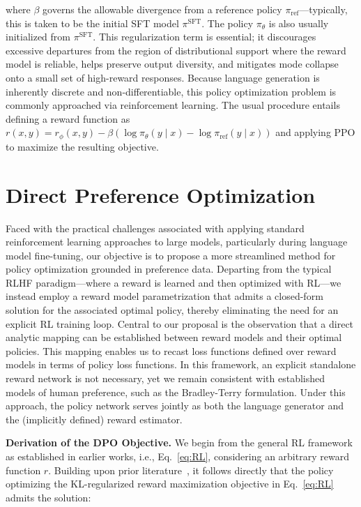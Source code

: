 where $\beta$ governs the allowable divergence from a reference policy $\pi_\text{ref}$—typically, this is taken to be the initial SFT model $\pi^\text{SFT}$. The policy $\pi_\theta$ is also usually initialized from $\pi^\text{SFT}$. This regularization term is essential; it discourages excessive departures from the region of distributional support where the reward model is reliable, helps preserve output diversity, and mitigates mode collapse onto a small set of high-reward responses. Because language generation is inherently discrete and non-differentiable, this policy optimization problem is commonly approached via reinforcement learning. The usual procedure \citep{ziegler2020finetuning, stiennon2022learning, bai2022training, ouyang2022training} entails defining a reward function as ${r(x, y) = r_{\phi}(x, y) -\beta (\log \pi_{\theta}(y\mid x) - \log \pi_\text{ref}(y\mid x))}$ and applying PPO \cite{schulman2017proximal} to maximize the resulting objective.

\section{Direct Preference Optimization}\label{sec:DPO}

Faced with the practical challenges associated with applying standard reinforcement learning approaches to large models, particularly during language model fine-tuning, our objective is to propose a more streamlined method for policy optimization grounded in preference data. Departing from the typical RLHF paradigm—where a reward is learned and then optimized with RL—we instead employ a reward model parametrization that admits a closed-form solution for the associated optimal policy, thereby eliminating the need for an explicit RL training loop. Central to our proposal is the observation that a direct analytic mapping can be established between reward models and their optimal policies. This mapping enables us to recast loss functions defined over reward models in terms of policy loss functions. In this framework, an explicit standalone reward network is not necessary, yet we remain consistent with established models of human preference, such as the Bradley-Terry formulation. Under this approach, the policy network serves jointly as both the language generator and the (implicitly defined) reward estimator.

\textbf{Derivation of the DPO Objective.} We begin from the general RL framework as established in earlier works, i.e., Eq.~\ref{eq:RL}, considering an arbitrary reward function $r$. Building upon prior literature~\citep{peters2007reinforcement, peng2019advantage, korbak2022reinforcement, go2023aligning}, it follows directly that the policy optimizing the KL-regularized reward maximization objective in Eq.~\ref{eq:RL} admits the solution:

